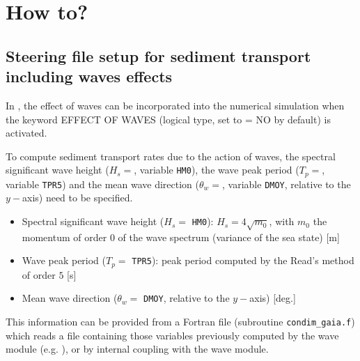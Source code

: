 \pagebreak
\section{How to?}
\subsection{Steering file setup for sediment transport including waves effects}
In \gaia{}, the effect of waves can be incorporated into the numerical simulation when the keyword
 {\ttfamily EFFECT OF WAVES} (logical type, set to {\ttfamily = NO} by default) is activated.

 To compute sediment transport rates due to the action of waves, the spectral significant wave height ($H_s =$, variable \texttt{HM0}), the wave peak period ($T_p =$, variable \texttt{TPR5}) and the mean wave direction ($\theta_w =$, variable \texttt{DMOY}, relative to the $y-$axis) need to be specified.

 \begin{itemize}
\item Spectral significant wave height ($H_s =$ \texttt{HM0}): $H_s=4\sqrt{m_0}$, with $m_0$ the momentum of order $0$ of the wave spectrum (variance of the sea state) [m]
\vspace{0.2cm}
\item Wave peak period ($T_p =$ \texttt{TPR5}): peak period computed by the Read's method of order $5$ [s]
\vspace{0.2cm}
\item Mean wave direction ($\theta_w =$ \texttt{DMOY}, relative to the $y-$axis) [deg.]
\end{itemize}

 This information can be provided from a Fortran file (subroutine \texttt{condim\_gaia.f}) which reads a file containing those variables previously computed by the wave module (e.g. \tomawac{}), or by internal coupling with the wave module.

